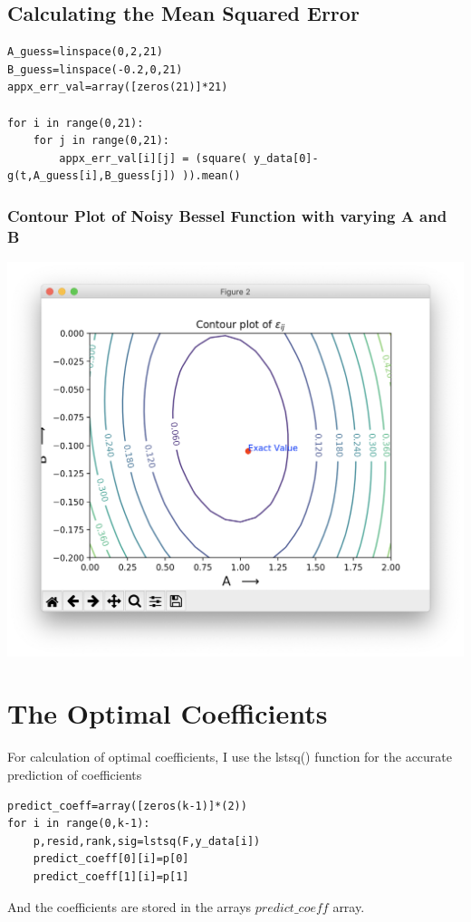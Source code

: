 \documentclass[10pt,english, openany]{book}
\begin{document}
\subsection{Calculating the Mean Squared Error}
\begin{verbatim}
A_guess=linspace(0,2,21)
B_guess=linspace(-0.2,0,21)
appx_err_val=array([zeros(21)]*21)

for i in range(0,21):
	for j in range(0,21):
		appx_err_val[i][j] = (square( y_data[0]-g(t,A_guess[i],B_guess[j]) )).mean()
\end{verbatim}

\subsubsection{Contour Plot of Noisy Bessel Function with varying A and B}
{\centering\includegraphics[scale=0.4]{scr3.png}}


\section{The Optimal Coefficients}
For calculation of optimal coefficients, I use the lstsq() function for the accurate prediction of coefficients
\begin{verbatim}
predict_coeff=array([zeros(k-1)]*(2))
for i in range(0,k-1):
	p,resid,rank,sig=lstsq(F,y_data[i])
	predict_coeff[0][i]=p[0]
	predict_coeff[1][i]=p[1]
\end{verbatim}
And the coefficients are stored in the arrays $predict\_coeff$ array.
\end{document}
